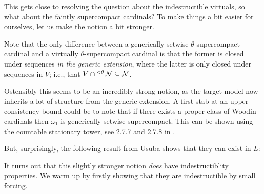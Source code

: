 \documentclass[../../main]{subfiles}
\begin{document}

This gets close to resolving the question about the indestructible virtuals, so what about the faintly supercompact cardinals? To make things a bit easier for ourselves, let us make the notion a bit stronger.


Note that the only difference between a generically setwise $\theta$-supercompact cardinal and a virtually $\theta$-supercompact cardinal is that the former is closed under sequences \textit{in the generic extension}, where the latter is only closed under sequences in $V$; i.e., that $V\cap{^{<\theta}}\operatorname{\mathcal N}\subseteq\operatorname{\mathcal N}$.

\qquad Ostensibly this seems to be an incredibly strong notion, as the target model now inherits a lot of structure from the generic extension. A first stab at an upper consistency bound could be to note that if there exists a proper class of Woodin cardinals then $\omega_1$ is generically setwise supercompact. This can be shown using the countable stationary tower, see 2.7.7 and 2.7.8 in \cite{stationary-tower}.

\qquad But, surprisingly, the following result from Usuba shows that they can exist in $L$:


It turns out that this slightly stronger notion \textit{does} have indestructiblity properties. We warm up by firstly showing that they are indestructible by small forcing.
\end{document}
